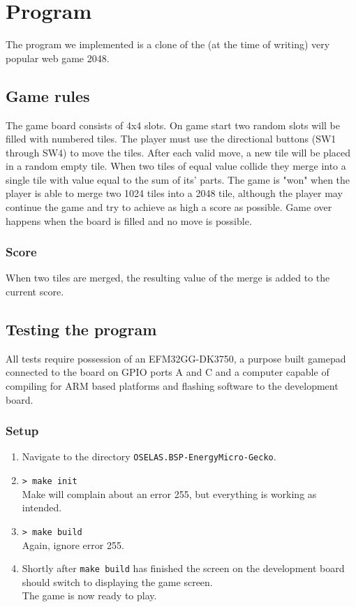 \section{Program}
The program we implemented is a clone of the (at the time of writing) very popular web game 2048\cite{2048}. 

\subsection{Game rules\label{game_rules}}
The game board consists of 4x4 slots.
On game start two random slots will be filled with numbered tiles.
The player must use the directional buttons (SW1 through SW4) to move the tiles.
After each valid move, a new tile will be placed in a random empty tile.
When two tiles of equal value collide they merge into a single tile with value equal to the sum of its' parts.
The game is "won" when the player is able to merge two 1024 tiles into a 2048 tile, although the player may continue the game and try to achieve as high a score as possible.
Game over happens when the board is filled and no move is possible.

\subsubsection{Score}
When two tiles are merged, the resulting value of the merge is added to the current score.

\subsection{Testing the program}
All tests require possession of an EFM32GG-DK3750, a purpose built gamepad connected to the board on GPIO ports A and C and a computer capable of compiling for ARM based platforms and flashing software to the development board.

\subsubsection{Setup}
\begin{enumerate}
    \item   Navigate to the directory \texttt{OSELAS.BSP-EnergyMicro-Gecko}.
    \item   \texttt{> make init}\\
	    Make will complain about an error 255, but everything is working as intended.
    \item   \texttt{> make build}\\
	    Again, ignore error 255.
    \item   Shortly after \texttt{make build} has finished the screen on the development board should switch to displaying the game screen.\\
	    The game is now ready to play.
\end{enumerate}

